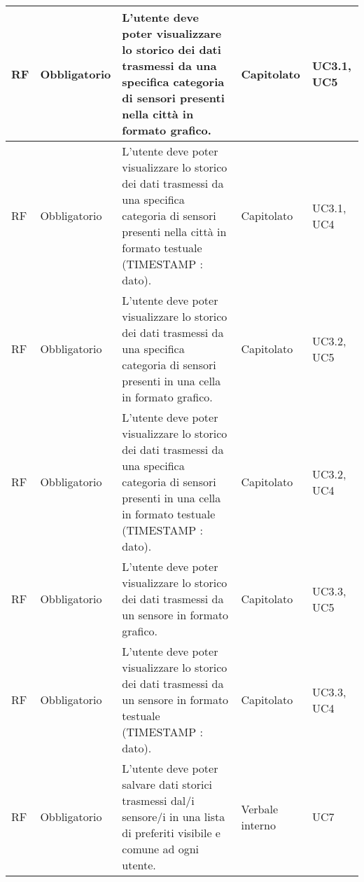 \begin{longtable}{|C{1cm}|C{2cm}|>{\raggedright}m{5cm}|C{2cm}|C{1.5cm}|}
    \hline
     RF & Obbligatorio        & L'utente deve poter visualizzare lo storico dei dati trasmessi da una specifica categoria di sensori presenti nella città in formato grafico.                                                                                       & Capitolato      & UC3.1, UC5               \\
    \hline
     RF & Obbligatorio        & L'utente deve poter visualizzare lo storico dei dati trasmessi da una specifica categoria di sensori presenti nella \newline città in formato testuale (TIMESTAMP : dato).                                                          & Capitolato & UC3.1, UC4                   \\
    \hline
     RF & Obbligatorio        & L'utente deve poter visualizzare lo storico dei dati trasmessi da una specifica categoria di sensori presenti in una cella in formato grafico.                                                                                      & Capitolato      & UC3.2, UC5             \\
    \hline
     RF & Obbligatorio        & L'utente deve poter visualizzare lo storico dei dati trasmessi da una specifica categoria di sensori presenti in \newline una cella in formato testuale (TIMESTAMP : dato).                                                         & Capitolato & UC3.2, UC4                \\
    \hline
     RF & Obbligatorio        & L'utente deve poter visualizzare lo storico dei dati trasmessi da un sensore in formato grafico.                                                                                                                                    & Capitolato & UC3.3, UC5                 \\
    \hline
     RF & Obbligatorio        & L'utente deve poter visualizzare lo storico dei dati trasmessi da un sensore in formato testuale (TIMESTAMP : dato).                                                                                                                & Capitolato & UC3.3, UC4            \\
    \hline
     RF & Obbligatorio        & L'utente deve poter salvare dati storici trasmessi dal/i sensore/i in una lista di preferiti visibile e comune ad ogni utente.                                & Verbale interno & UC7               \\

\end{longtable}
